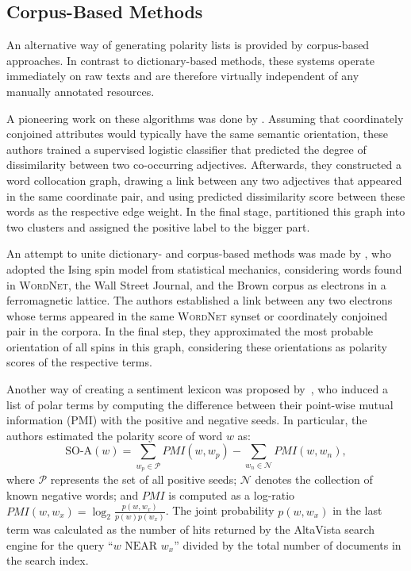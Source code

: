 
\subsection{Corpus-Based Methods}\label{subsec:snt-lex:corpus-based}

An alternative way of generating polarity lists is provided by
corpus-based approaches.  In contrast to dictionary-based methods,
these systems operate immediately on raw texts and are therefore
virtually independent of any manually annotated resources.

A pioneering work on these algorithms was done by
\citet{Hatzivassi:97}.  Assuming that coordinately conjoined
attributes would typically have the same semantic orientation, these
authors trained a supervised logistic classifier that predicted the
degree of dissimilarity between two co-occurring adjectives.
Afterwards, they constructed a word collocation graph, drawing a link
between any two adjectives that appeared in the same coordinate pair,
and using predicted dissimilarity score between these words as the
respective edge weight.  In the final stage,
\citet{Hatzivassi:97} partitioned this graph into two clusters
and assigned the positive label to the bigger part.

An attempt to unite dictionary- and corpus-based methods was made by
\citet{Takamura:05}, who adopted the Ising spin model from statistical
mechanics, considering words found in \textsc{WordNet}, the Wall
Street Journal, and the Brown corpus as electrons in a ferromagnetic
lattice.  The authors established a link between any two electrons
whose terms appeared in the same \textsc{WordNet} synset or
coordinately conjoined pair in the corpora.  In the final step, they
approximated the most probable orientation of all spins in this graph,
considering these orientations as polarity scores of the respective
terms.

Another way of creating a sentiment lexicon was proposed
by~\citet{Turney:03}, who induced a list of polar terms by computing
the difference between their point-wise mutual information (PMI) with
the positive and negative seeds.  In particular, the authors estimated
the polarity score of word $w$ as:
\begin{equation*}
  \textrm{SO-A}(w) = \sum_{w_p\in\mathcal{P}}PMI(w, w_p) - \sum_{w_n\in\mathcal{N}}PMI(w, w_n),
\end{equation*}
where $\mathcal{P}$ represents the set of all positive seeds;
$\mathcal{N}$ denotes the collection of known negative words; and
$PMI$ is computed as a log-ratio $PMI(w, w_x) = \log_2\frac{p(w,
  w_x)}{p(w)p(w_x)}$.  The joint probability $p(w, w_x)$ in the last
term was calculated as the number of hits returned by the AltaVista
search engine for the query ``$w\textrm{ NEAR }w_x$'' divided by the
total number of documents in the search index.

